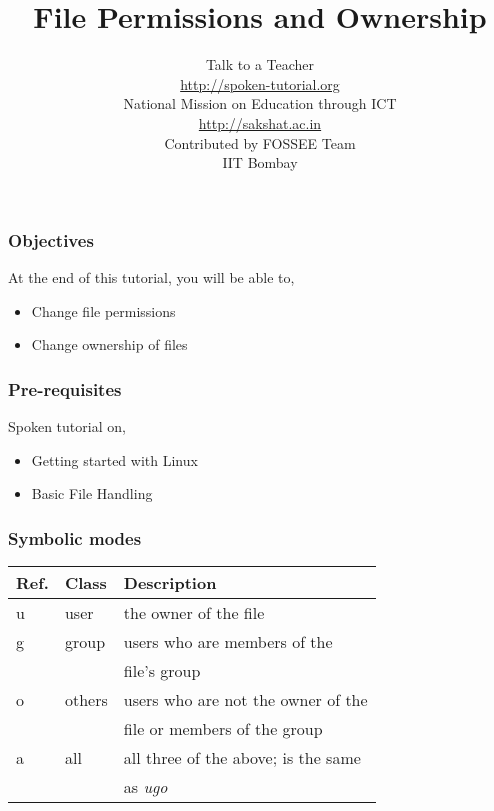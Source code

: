 \documentclass[17pt,compress]{beamer}
\author[FOSSEE]{}
\institute[IIT Bombay]{}
\date[]{}
\begin{document}
\sffamily \bfseries
\title
[File Permissions and Ownership]
{File Permissions and Ownership}
\author
[FOSSEE]
{\small Talk to a Teacher\\{\color{blue}\url{http://spoken-tutorial.org}}\\\vspace{0.25cm}National Mission on Education
 through ICT\\{\color{blue}\url{ http://sakshat.ac.in}} \\ [0.77cm]
   Contributed by FOSSEE Team \\IIT Bombay  \\[0.3cm]
}

\begin{frame}
   \titlepage
\end{frame}

\begin{frame}
\frametitle{Objectives}
\label{sec-2}

At the end of this tutorial, you will be able to,
\begin{itemize}
\item Change file permissions
\item Change ownership of files
\end{itemize}
\end{frame}

\begin{frame}
\frametitle{Pre-requisites}
\label{sec-3}

Spoken tutorial on, 
\begin{itemize}
\item Getting started with Linux
\item Basic File Handling
\end{itemize}
\end{frame}

\begin{frame}[fragile]
  \frametitle{Symbolic modes}
  \begin{small}
    \begin{center}
      \begin{tabular}{lll}
        Ref.  &  Class   &  Description                                                      \\
        \hline
        u     &  user    &  the owner of the file                                            \\
        g     &  group   &  users who are members of the                                     \\
              &          &  file's group  \\
        o     &  others  &  users who are not the owner of the                           \\
              &          &  file or members of the group\\
        a     &  all     &  all three of the above; is the same                              \\
              &          &  as \emph{ugo}
      \end{tabular}
    \end{center}
   \end{small}
\end{frame}
\end{document}
